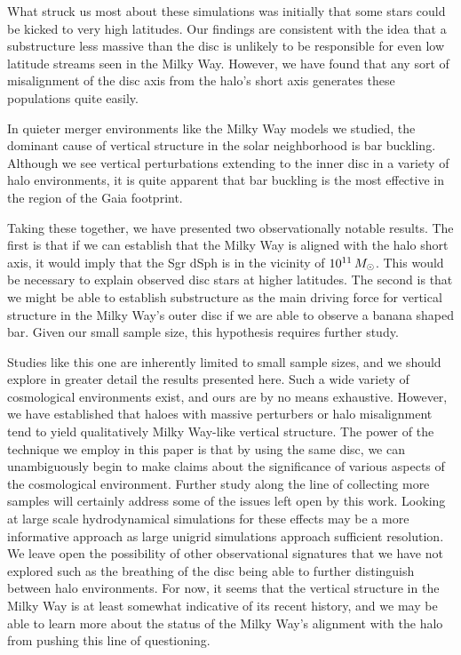 What struck us most about these simulations was initially that some stars could be kicked to very high latitudes. Our findings are consistent with the idea that a substructure less massive than the disc is unlikely to be responsible for even low latitude streams seen in the Milky Way. However, we have found that any sort of misalignment of the disc axis from the halo's short axis generates these populations quite easily.

In quieter merger environments like the Milky Way models we studied, the dominant cause of vertical structure in the solar neighborhood is bar buckling. Although  we see vertical perturbations extending to the inner disc in a variety of halo environments, it is quite apparent that bar buckling is the most effective in the region of the Gaia footprint.

Taking these together, we have presented two observationally notable results. The first is that if we can establish that the Milky Way is aligned with the halo short axis, it would imply that the Sgr dSph is in the vicinity of $10^{11}\,M_\odot$. This would be necessary to explain observed disc stars at higher latitudes. The second is that we might be able to establish substructure as the main driving force for vertical structure in the Milky Way's outer disc if we are able to observe a banana shaped bar. Given our small sample size, this hypothesis requires further study.

Studies like this one are inherently limited to small sample sizes, and we should explore in greater detail the results presented here. Such a wide variety of cosmological environments exist, and ours are by no means exhaustive. However, we have established that haloes with massive perturbers or halo misalignment tend to yield qualitatively Milky Way-like vertical structure. The power of the technique we employ in this paper is that by using the same disc, we can unambiguously begin to make claims about the significance of various aspects of the cosmological environment. Further study along the line of collecting more samples will certainly address some of the issues left open by this work. Looking at large scale hydrodynamical simulations for these effects may be a more informative approach as large unigrid simulations approach sufficient resolution. We leave open the possibility of other observational signatures that we have not explored such as the breathing of the disc being able to further distinguish between halo environments. For now, it seems that the vertical structure in the Milky Way is at least somewhat indicative of its recent history, and we may be able to learn more about the status of the Milky Way's alignment with the halo from pushing this line of questioning.

